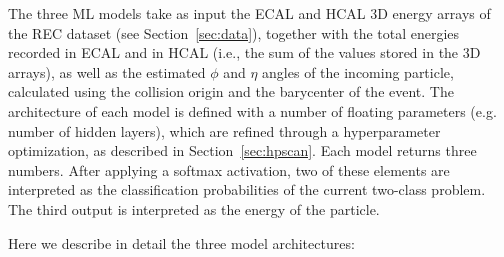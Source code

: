 The three ML models take as input the ECAL and HCAL 3D energy arrays of the REC dataset (see Section~\ref{sec:data}), together with the total energies recorded in ECAL and in HCAL (i.e., the sum of the values stored in the 3D arrays), as well as the estimated $\phi$ and $\eta$ angles of the incoming particle, calculated using the collision origin and the barycenter of the event. The architecture of each model is defined with a number of floating parameters (e.g. number of hidden layers), which are refined through a hyperparameter optimization, as described in Section~\ref{sec:hpscan}. Each model returns three numbers. After applying a softmax activation, two of these elements are interpreted as the classification probabilities of the current two-class problem. The third output is interpreted as the energy of the particle.

Here we describe in detail the three model architectures:

